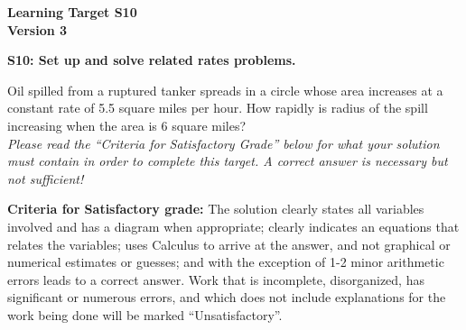 \documentclass[10pt]{article}
\begin{document}
	\vspace*{0in}

		\begin{center}
			\textbf{Learning Target S10 \\
			Version 3} %
		\end{center}


\begin{framed}
	\textbf{S10: Set up and solve related rates problems.}
\end{framed}

Oil spilled from a ruptured tanker spreads in a circle whose area increases at a constant rate of 5.5 square miles per hour.  How rapidly is radius of the spill increasing when the area is 6 square miles? \\ 
 
\emph{Please read the ``Criteria for Satisfactory Grade'' below for what your solution must contain in order to complete this target. A correct answer is necessary but not sufficient!} 




\vfill

\begin{small}
    \begin{framed}
        	\textbf{Criteria for Satisfactory grade:} The solution clearly states all variables involved and has a diagram when appropriate; clearly indicates an equations that relates the variables; uses Calculus to arrive at the answer, and not graphical or numerical estimates or guesses; and with the exception of 1-2 minor arithmetic errors leads to a correct answer. Work that is incomplete, disorganized, has significant or numerous errors, and which does not include explanations for the work being done will be marked ``Unsatisfactory''. 
    \end{framed}

\end{small}
\end{document}
